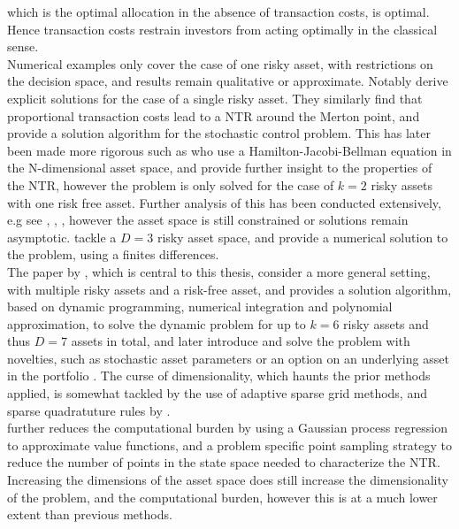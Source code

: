 \documentclass[11pt]{article}
\begin{document}
which is the optimal allocation in the absence of transaction costs, is optimal. Hence transaction costs restrain
investors from acting optimally in the classical sense.\\
Numerical examples only cover the case of one risky asset, with restrictions on the decision space, and results remain qualitative or approximate.
Notably \textcite{DavisNorman1990} derive explicit solutions for the case of a single risky asset.
They similarly find that proportional transaction costs lead to a \ac{NTR} around the Merton point, and provide a solution algorithm for the stochastic control problem.
This has later been made more rigorous such as 
\textcite{Aikan1996} who use a Hamilton-Jacobi-Bellman equation in the N-dimensional asset space, and provide further insight to the properties of the \ac{NTR}, however the problem is only solved for the case of $k=2$ risky assets with one risk free asset.
Further analysis of this has been conducted extensively, e.g see \textcite{ShreveSoner1994}, \textcite{Oksendal2002}, \textcite{JanecekShreve2004}, however 
the asset space is still constrained or solutions remain asymptotic. 
\textcite{Muthuraman2006,Muthuraman2008} tackle a $D=3$ risky asset space, and provide a numerical solution to the problem, using a finites differences.\\
The paper by \textcite{CaiJuddXu2013}, which is central to this thesis, consider a more general setting, with multiple risky assets and a risk-free asset,
and provides a solution algorithm, based on dynamic programming, numerical integration and polynomial approximation,
to solve the dynamic problem for up to $k=6$ risky assets and thus $D=7$ assets in total,
and later introduce and solve the problem with novelties, such as stochastic asset parameters
or an option on an underlying asset in the portfolio \textcite{CaiJuddXu2020}.
The curse of dimensionality, which haunts the prior methods applied, is somewhat tackled by the use
of adaptive sparse grid methods, and sparse quadratuture rules by \textcite{Schober2022}.\\
\textcite{Scheidegger2023} further reduces the computational burden by using a Gaussian process regression
to approximate value functions, and a problem specific point sampling strategy to reduce the number of points in the state space
needed to characterize the \ac{NTR}.
Increasing the dimensions of the asset space does still increase the dimensionality of the problem, and the computational burden,
however this is at a much lower extent than previous methods.\\
\end{document}
